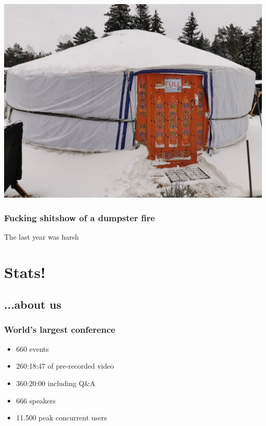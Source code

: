 \documentclass[aspectratio=169]{beamer}
\begin{document}
\begin{frame}
	\begin{center}
	\vfill
		\includegraphics[scale=0.25]{images/fosdem_home_1_768.jpg}
	\vfill
	\end{center}
\end{frame}

\begin{frame}
	\frametitle{Fucking shitshow of a dumpster fire}
	\begin{center}
	\vfill
	The last year was harsh	
	\vfill
	\end{center}
\end{frame}

\section{Stats!}

\subsection{...about us}

\begin{frame}
	\frametitle{World's largest conference}
	\vfill
	\begin{itemize}
		\item 660 events
		\item 260:18:47 of pre-recorded video
		\item 360:20:00 including Q\&A
		\item 666 speakers
		\item 11.500 peak concurrent users
	\end{itemize}
	\vfill
\end{frame}
\end{document}
